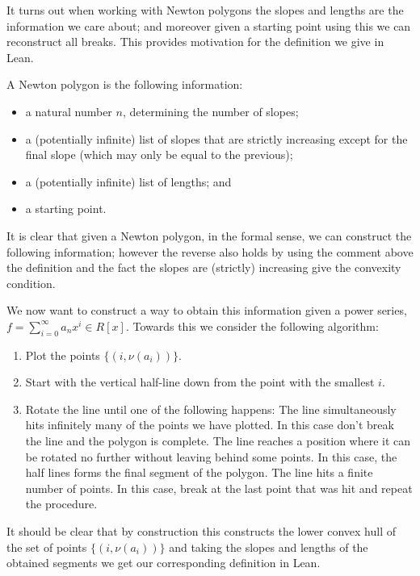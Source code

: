 It turns out when working with Newton polygons the slopes and lengths are the information we care about;
and moreover given a starting point using this we can reconstruct all breaks. This provides motivation
for the definition we give in Lean.

\begin{definition}
  A Newton polygon is the following information:
  \begin{itemize}
    \item a natural number $n$, determining the number of slopes;
    \item a (potentially infinite) list of slopes that are strictly increasing except for the final
      slope (which may only be equal to the previous);
    \item a (potentially infinite) list of lengths; and
    \item a starting point.
  \end{itemize}
\end{definition}

It is clear that given a Newton polygon, in the formal sense, we can construct the following information;
however the reverse also holds by using the comment above the definition and the fact the slopes are
(strictly) increasing give the convexity condition.

We now want to construct a way to obtain this information given a power series, $f = \sum_{i=0}^\infty a_n x^i \in R[x]$.
Towards this we consider the following algorithm:

\begin{enumerate}
    \item Plot the points $\{(i,\nu (a_i) )\}$.
    \item Start with the vertical half-line down from the point with the smallest $i$.
    \item Rotate the line until one of the following happens:
    \subitem The line simultaneously hits infinitely many of the points we have plotted. In this
        case don't break the line and the polygon is complete.
    \subitem The line reaches a position where it can be rotated no further without leaving behind
        some points. In this case, the half lines forms the final segment of the polygon.
    \subitem The line hits a finite number of points. In this case, break at the last point that was
        hit and repeat the procedure.
\end{enumerate}

It should be clear that by construction this constructs the lower convex hull of the set of points
$\{(i,\nu (a_i) )\}$ and taking the slopes and lengths of the obtained segments we get our corresponding
definition in Lean.

